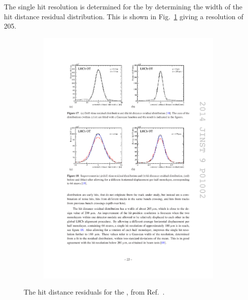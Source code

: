 The single hit resolution is determined for the \ot by determining the width of the hit distance residual distribution. This is shown in Fig.~\ref{fig:Dec_ot_resolution} giving a resolution of 205\mum.



\begin{figure}[!h]
    \centering
    \begin{subfigure}[t]{0.4\textwidth}
        \centering
        \includegraphics[width=1.0\textwidth]{figs/Detector/ot_residuals.pdf}
    \end{subfigure}
    \caption{The hit distance residuals for the \ot, from Ref.~\cite{LHCb-DP-2013-003}.}
    \label{fig:Dec_ot_resolution}   
\end{figure}




